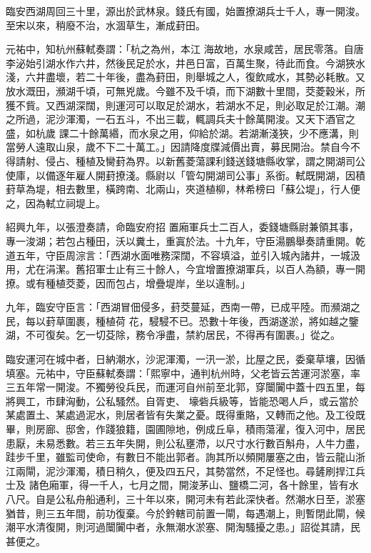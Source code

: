 \begin{pinyinscope}
 臨安西湖周回三十里，源出於武林泉。錢氏有國，始置撩湖兵士千人，專一開浚。至宋以來，稍廢不治，水涸草生，漸成葑田。



 元祐中，知杭州蘇軾奏謂：「杭之為州，本江
 海故地，水泉咸苦，居民零落。自唐李泌始引湖水作六井，然後民足於水，井邑日富，百萬生聚，待此而食。今湖狹水淺，六井盡壞，若二十年後，盡為葑田，則舉城之人，復飲咸水，其勢必耗散。又放水溉田，瀕湖千頃，可無兇歲。今雖不及千頃，而下湖數十里間，茭菱穀米，所獲不貲。又西湖深闊，則運河可以取足於湖水，若湖水不足，則必取足於江潮。潮之所過，泥沙渾濁，一石五斗，不出三載，輒調兵夫十餘萬開浚。又天下酒官之盛，如杭歲
 課二十餘萬緡，而水泉之用，仰給於湖。若湖漸淺狹，少不應溝，則當勞人遠取山泉，歲不下二十萬工。」因請降度牒減價出賣，募民開治。禁自今不得請射、侵占、種植及臠葑為界。以新舊菱蕩課利錢送錢塘縣收掌，謂之開湖司公使庫，以備逐年雇人開葑撩淺。縣尉以「管勾開湖司公事」系銜。軾既開湖，因積葑草為堤，相去數里，橫跨南、北兩山，夾道植柳，林希榜曰「蘇公堤」，行人便之，因為軾立祠堤上。



 紹興九年，以張澄奏請，命臨安府招
 置廂軍兵士二百人，委錢塘縣尉兼領其事，專一浚湖；若包占種田，沃以糞土，重寘於法。十九年，守臣湯鵬舉奏請重開。乾道五年，守臣周淙言：「西湖水面唯務深闊，不容填溢，並引入城內諸井，一城汲用，尤在涓潔。舊招軍士止有三十餘人，今宜增置撩湖軍兵，以百人為額，專一開撩。或有種植茭菱，因而包占，增疊堤岸，坐以違制。」



 九年，臨安守臣言：「西湖冒佃侵多，葑茭蔓延，西南一帶，已成平陸。而瀕湖之民，每以葑草圍裹，種植荷
 花，駸駸不已。恐數十年後，西湖遂淤，將如越之鑒湖，不可復矣。乞一切芟除，務令凈盡，禁約居民，不得再有圍裹。」從之。



 臨安運河在城中者，日納潮水，沙泥渾濁，一汛一淤，比屋之民，委棄草壤，因循填塞。元祐中，守臣蘇軾奏謂：「熙寧中，通判杭州時，父老皆云苦運河淤塞，率三五年常一開浚。不獨勞役兵民，而運河自州前至北郭，穿闤闠中蓋十四五里，每將興工，市肆洶動，公私騷然。自胥吏、
 壕砦兵級等，皆能恐喝人戶，或云當於某處置土、某處過泥水，則居者皆有失業之憂。既得重賂，又轉而之他。及工役既畢，則房廊、邸舍，作踐狼籍，園圃隙地，例成丘阜，積雨蕩濯，復入河中，居民患厭，未易悉數。若三五年失開，則公私壅滯，以尺寸水行數百斛舟，人牛力盡，跬步千里，雖監司使命，有數日不能出郭者。詢其所以頻開屢塞之由，皆云龍山浙江兩閘，泥沙渾濁，積日稍久，便及四五尺，其勢當然，不足怪也。尋鏟刷捍江兵士及
 諸色廂軍，得一千人，七月之間，開浚茅山、鹽橋二河，各十餘里，皆有水八尺。自是公私舟船通利，三十年以來，開河未有若此深快者。然潮水日至，淤塞猶昔，則三五年間，前功復棄。今於鈐轄司前置一閘，每遇潮上，則暫閉此閘，候潮平水清復開，則河過闤闠中者，永無潮水淤塞、開淘騷擾之患。」詔從其請，民甚便之。




\end{pinyinscope}
